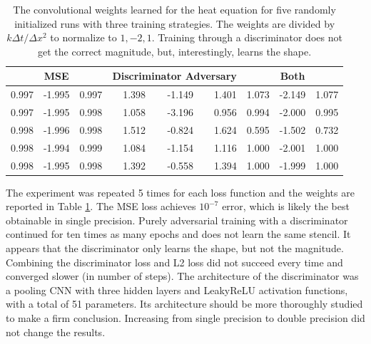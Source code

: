 \documentclass{article}
\begin{document}
\begin{table}
  \caption{\label{tab:conv}The convolutional weights learned for the
    heat equation for five randomly initialized runs with three
    training strategies. The weights are
    divided by $k \Delta t / \Delta x^2$ to normalize to
    $1,-2,1$. Training through a discriminator does not get the
    correct magnitude, but, interestingly, learns the shape.}
  \centering
  \begin{tabular}{rrr|rrr|rrr}
    \hline
    \multicolumn{3}{c}{MSE} & \multicolumn{3}{c}{Discriminator Adversary}  &\multicolumn{3}{c}{Both} \\
\hline
 0.997 & -1.995 & 0.997 & 1.398 & -1.149 & 1.401 & 1.073 & -2.149 & 1.077 \\
 0.997 & -1.995 & 0.998 & 1.058 & -3.196 & 0.956 & 0.994 & -2.000 & 0.995 \\
 0.998 & -1.996 & 0.998 & 1.512 & -0.824 & 1.624 & 0.595 & -1.502 & 0.732 \\
 0.998 & -1.994 & 0.999 & 1.084 & -1.154 & 1.116 & 1.000 & -2.001 & 1.000 \\
 0.998 & -1.995 & 0.998 & 1.392 & -0.558 & 1.394 & 1.000 & -1.999 & 1.000 \\
\hline
\end{tabular}
\end{table}




The experiment was repeated 5
times for each loss function and the weights are reported in
Table \ref{tab:conv}.
The MSE loss achieves $10^{-7}$ error, which is likely the best obtainable in single precision.
Purely adversarial training with a discriminator continued for ten
times as many epochs and does not
learn the same stencil. It appears that the discriminator only learns
the shape, but not the magnitude. Combining the
discriminator loss and L2 loss did not succeed every time and
converged slower (in number of steps). 
The architecture of the discriminator was a pooling CNN with three
hidden layers and LeakyReLU activation functions, with a total of 51
parameters. Its architecture should be more thoroughly
studied to make a firm conclusion. Increasing from single
precision to double precision did not change the results.
\end{document}
